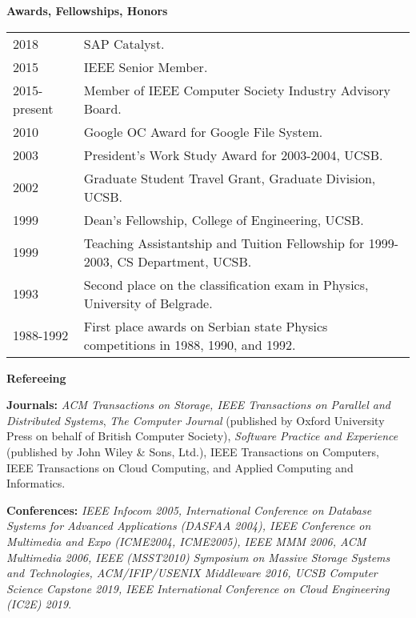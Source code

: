 \documentclass[10pt]{article}
\renewcommand{\section}[1]{ \vspace{10pt}\begin{flushleft}{\hspace{-0.2in }\Large\bf
    #1}\end{flushleft}\nopagebreak }
\begin{document}
\section{Awards, Fellowships, Honors}
\begin{tabular}{ll}
2018 	& SAP Catalyst. \\
2015 	& IEEE Senior Member. \\
2015-present 	& Member of IEEE Computer Society Industry Advisory Board. \\
2010 	& Google OC Award for Google File System. \\
2003 	& President's Work Study Award for 2003-2004, UCSB. \\
2002	& Graduate Student Travel Grant, Graduate Division, UCSB.\\
1999 	& Dean's Fellowship, College of Engineering, UCSB. \\
1999 	& Teaching Assistantship and Tuition Fellowship for 1999-2003, 
		CS Department, UCSB. \\
1993 	& Second place on the classification exam in Physics, University of Belgrade. \\
1988-1992 & First place awards on Serbian state Physics competitions in 
		1988, 1990, and 1992.
\end{tabular}


\section{Refereeing}

{\bf Journals:}
{\em ACM Transactions on Storage, IEEE Transactions on Parallel and Distributed Systems},
{\em The Computer Journal} (published by Oxford University Press on behalf of
British Computer Society), {\em Software Practice and Experience}
(published by John Wiley \& Sons, Ltd.), IEEE Transactions on Computers, 
IEEE Transactions on Cloud Computing, and Applied Computing and Informatics.

{\bf Conferences:}
{\em IEEE Infocom 2005, International Conference on Database Systems for
Advanced Applications (DASFAA 2004), IEEE Conference on Multimedia and
Expo (ICME2004, ICME2005), IEEE MMM 2006, ACM Multimedia 2006, IEEE (MSST2010) Symposium on 
Massive Storage Systems and Technologies, ACM/IFIP/USENIX Middleware 2016, UCSB Computer Science Capstone 2019,
IEEE International Conference on Cloud Engineering (IC2E) 2019}.
\end{document}
